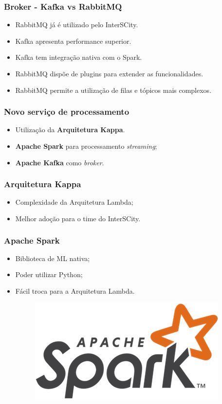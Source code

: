 \documentclass{beamer}
\begin{document}
  \begin{frame}
      \frametitle{Broker - Kafka vs RabbitMQ}
      \begin{itemize}
          \item RabbitMQ já é utilizado pelo InterSCity.
          \item Kafka apresenta performance superior.
          \item Kafka tem integração nativa com o Spark.
          \item RabbitMQ dispõe de plugins para extender as funcionalidades.
          \item RabbitMQ permite a utilização de filas e tópicos mais complexos.
      \end{itemize}
  \end{frame}

  \begin{frame}
      \frametitle{Novo serviço de processamento}
      \begin{itemize}
          \item<2-> Utilização da \textbf{Arquitetura Kappa}.
          \item<3-> \textbf{Apache Spark} para processamento \textit{streaming};
          \item<4-> \textbf{Apache Kafka} como \textit{broker}.
      \end{itemize}
  \end{frame}

  \begin{frame}
      \frametitle{Arquitetura Kappa}
      \begin{itemize}
          \item Complexidade da Arquitetura Lambda;
          \item Melhor adoção para o time do InterSCity.
      \end{itemize}
  \end{frame}

  \begin{frame}
      \frametitle{Apache Spark}
      \begin{itemize}
          \item Biblioteca de ML nativa;
          \item Poder utilizar Python;
          \item Fácil troca para a Arquitetura Lambda.
              \begin{figure}
                  \includegraphics[scale=0.3]{figures/spark_logo.png}
              \end{figure}
      \end{itemize}
  \end{frame}
\end{document}
